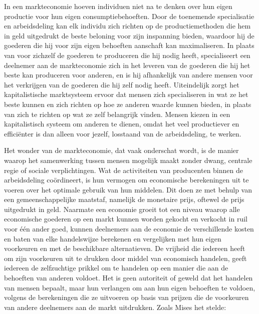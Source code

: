 In een markteconomie hoeven individuen niet na te denken over hun eigen productie voor hun eigen consumptiebehoeften. Door de toenemende specialisatie en arbeidsdeling kan elk individu zich richten op de productiemethoden die hem in geld uitgedrukt de beste beloning voor zijn inspanning bieden, waardoor hij de goederen die hij voor zijn eigen behoeften aanschaft kan maximaliseren. In plaats van voor zichzelf de goederen te produceren die hij nodig heeft, specialiseert een deelnemer aan de markteconomie zich in het leveren van de goederen die hij het beste kan produceren voor anderen, en is hij afhankelijk van andere mensen voor het verkrijgen van de goederen die hij zelf nodig heeft. Uiteindelijk zorgt het kapitalistische marktsysteem ervoor dat mensen zich specialiseren in wat ze het beste kunnen en zich richten op hoe ze anderen waarde kunnen bieden, in plaats van zich te richten op wat ze zelf belangrijk vinden. Mensen kiezen in een kapitalistisch systeem om anderen te dienen, omdat het veel productiever en efficiënter is dan alleen voor jezelf, losstaand van de arbeidsdeling, te werken.

Het wonder van de markteconomie, dat vaak onderschat wordt, is de manier waarop het samenwerking tussen mensen mogelijk maakt zonder dwang, centrale regie of sociale verplichtingen. Wat de activiteiten van producenten binnen de arbeidsdeling coördineert, is hun vermogen om economische berekeningen uit te voeren over het optimale gebruik van hun middelen. Dit doen ze met behulp van een gemeenschappelijke maatstaf, namelijk de monetaire prijs, oftewel de prijs uitgedrukt in geld. Naarmate een economie groeit tot een niveau waarop alle economische goederen op een markt kunnen worden gekocht en verkocht in ruil voor één ander goed, kunnen deelnemers aan de economie de verschillende kosten en baten van elke handelswijze berekenen en vergelijken met hun eigen voorkeuren en met de beschikbare alternatieven. De vrijheid die iedereen heeft om zijn voorkeuren uit te drukken door middel van economisch handelen, geeft iedereen de zelfzuchtige prikkel om te handelen op een manier die aan de behoeften van anderen voldoet. Het is geen autoriteit of geweld dat het handelen van mensen bepaalt, maar hun verlangen om aan hun eigen behoeften te voldoen, volgens de berekeningen die ze uitvoeren op basis van prijzen die de voorkeuren van andere deelnemers aan de markt uitdrukken. Zoals Mises het stelde:




